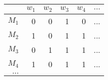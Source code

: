 
\begin{longtable}{|r||r|r|r|r|r|}
\hline 
         & $w_1$ & $w_2$ & $w_3$ & $w_4$ & $\ldots$ \\ \hline \hline 
$M_1$    & 0     & 0     & 1     & 0     & ...      \\ \hline 
$M_2$    & 1     & 0     & 1     & 1     & ...      \\ \hline 
$M_3$    & 0     & 1     & 1     & 1     & ...      \\ \hline 
$M_4$    & 1     & 0     & 1     & 1     & ...      \\ \hline 
$\ldots$ &       &       &       &       &          \\ \hline 
\end{longtable}
        
